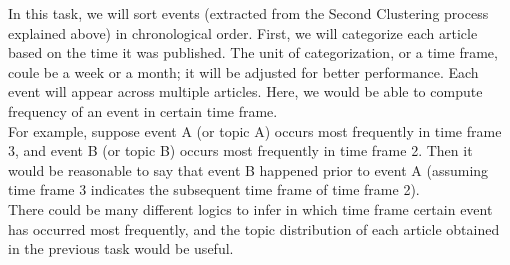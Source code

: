  In this task, we will sort events (extracted from the Second Clustering process explained above) in chronological order. First, we will categorize each article based on the time it was published. The unit of categorization, or a time frame, coule be a week or a month; it will be adjusted for better performance. Each event will appear across multiple articles. Here, we would be able to compute frequency of an event in certain time frame.\\
 For example, suppose event A (or topic A) occurs most frequently in time frame 3, and event B (or topic B) occurs most frequently in time frame 2. Then it would be reasonable to say that event B happened prior to event A (assuming time frame 3 indicates the subsequent time frame of time frame 2).\\
 There could be many different logics to infer in which time frame certain event has occurred most frequently, and the topic distribution of each article obtained in the previous task would be useful.